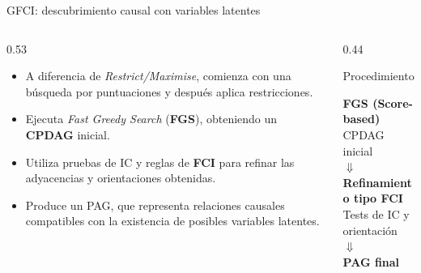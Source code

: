 \documentclass[aspectratio=169,11pt]{beamer}
\begin{document}
\begin{frame}[t]{GFCI: descubrimiento causal con variables latentes}
  \begin{columns}[T,onlytextwidth]

    \begin{column}{0.53\textwidth}
      \begin{itemize}

        \item A diferencia de \textit{Restrict/Maximise},
        comienza con una búsqueda por puntuaciones
        y después aplica restricciones.

        \item Ejecuta \textit{Fast Greedy Search}
        (\textbf{FGS}), obteniendo un
        \textbf{CPDAG} inicial.

        \item Utiliza pruebas de IC y reglas de
        \textbf{FCI} para refinar las adyacencias
        y orientaciones obtenidas.

        \item Produce un \alert{PAG}, que representa
        relaciones causales compatibles con la
        existencia de posibles variables latentes.

      \end{itemize}
    \end{column}

    \begin{column}{0.44\textwidth}

  \begin{block}{Procedimiento}
    \centering
    \small

    \textbf{FGS (Score-based)}\\
    {\scriptsize CPDAG inicial}\\[0.05cm]

    $\Downarrow$\\[0.05cm]

    \textbf{Refinamiento tipo FCI}\\
    {\scriptsize Tests de IC y orientación}\\[0.05cm]

    $\Downarrow$\\[0.05cm]

    \textbf{PAG final}

  \end{block}


\end{column}
\end{columns}
\end{frame}
\end{document}
